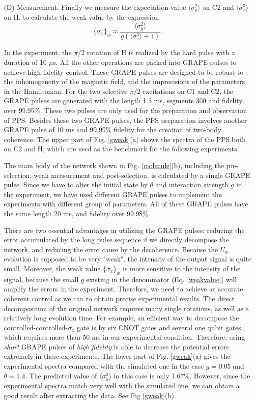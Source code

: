 \documentclass[aps,pra,12pt,onecolumn,showpacs,superscriptaddress,floatfix,footinbib,subfigure]{revtex4}
\begin{document}
(D) Measurement. Finally we measure the expectation value $\langle \sigma_y^2 \rangle$ on C2 and $\langle \sigma_z^3 \rangle$ on H, to calculate the weak value by the expression
 \begin{equation}\label{weakvalue}
\{ \sigma_x \}_w \approx \frac{\langle \sigma_y^2 \rangle}{ g(\langle \sigma_z^3 \rangle+1)}.
 \end{equation}

In the experiment, the $\pi/2$ rotation of H is realized by the hard pulse with a duration of 10 $\mu$s. All the other operations are packed into GRAPE pulses to achieve high-fidelity control. These GRAPE pulses are designed to be robust to the inhomogeneity of the magnetic field, and the imprecisions of the parameters in the Hamiltonian. For the two selective $\pi/2$ excitations on C1 and C2, the GRAPE pulses are generated with the length 1.5 ms, segments 300 and fidelity over 99.95\%. These two pulses are only used for the preparation and observation of PPS. Besides these two GRAPE pulses, the PPS preparation involves another GRAPE pulse of 10 ms and 99.99\% fidelity for the creation of two-body coherence. The upper part of Fig. \ref{gweak}(a) shows the spectra of the PPS both on C2 and H, which are used as the benchmark for the following experiments.

The main body of the network shown in Fig. \ref{molecule}(b), including the pre-selection, weak measurement and post-selection, is calculated by a single GRAPE pulse. Since we have to alter the initial state by $\theta$ and interaction strength $g$ in the experiment, we have used different GRAPE pulses to implement the experiments with different group of parameters. All of these GRAPE pulses have the same length 20 ms, and fidelity over 99.98\%.

There are two essential advantages in utilizing the GRAPE pulses: reducing the error accumulated by the long pulse sequence if we directly decompose the network, and reducing the error cause by the decoherence. Because the $U_w$ evolution is supposed to be very "weak", the intensity of the output signal is quite small. Moreover, the weak value $\{ \sigma_x \}_w$ is more sensitive to the intensity of the signal, because the small $g$ existing in the denominator (Eq. \ref{weakvalue}) will amplify the errors in the experiment. Therefore, we need to achieve as accurate coherent control as we can to obtain precise experimental results. The direct decomposition of the original network requires many single rotations, as well as a relatively long evolution time. For example, an efficient way to decompose the controlled-controlled-$\sigma_z$ gate is by six CNOT gates and several one qubit gates \cite{chuangbook}, which requires more than 50 ms in our experimental condition. Therefore, using \emph{short} GRAPE pulses of \emph{high fidelity} is able to decrease the potential errors extremely in these experiments. The lower part of Fig. \ref{gweak}(a) gives the experimental spectra compared with the simulated one in the case $g=0.05$ and $\theta = 1.4$. The predicted value of $\langle \sigma_y^2 \rangle$ in this case is only 1.67\%. However, since the experimental spectra match very well with the simulated one, we can obtain a good result after extracting the data. See Fig \ref{gweak}(b).
\end{document}
